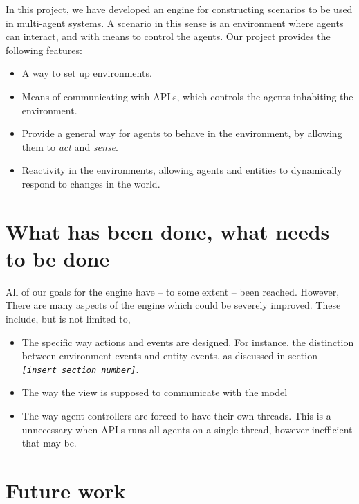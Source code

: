 In this project, we have developed an engine for constructing scenarios
to be used in multi-agent systems. A scenario in this sense is an
environment where agents can interact, and with means to control the
agents. Our project provides the following features:
\begin{itemize}
\item A way to set up environments.
\item Means of communicating with APLs, which controls the agents inhabiting
the environment.
\item Provide a general way for agents to behave in the environment, by
allowing them to \emph{act} and \emph{sense}.
\item Reactivity in the environments, allowing agents and entities to dynamically
respond to changes in the world.
\end{itemize}

\section*{What has been done, what needs to be done}

All of our goals for the engine have -- to some extent -- been reached.
However, There are many aspects of the engine which could be severely
improved. These include, but is not limited to, 
\begin{itemize}
\item The specific way actions and events are designed. For instance, the
distinction between environment events and entity events, as discussed
in section \texttt{\emph{{[}insert section number{]}}}.
\item The way the view is supposed to communicate with the model
\item The way agent controllers are forced to have their own threads. This
is a unnecessary when APLs runs all agents on a single thread, however
inefficient that may be.
\end{itemize}

\section*{Future work}

